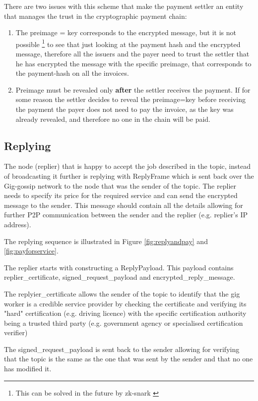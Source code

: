 \documentclass{article}
\begin{document}
There are two issues with this scheme that make the payment settler an entity that manages the trust in the cryptographic payment chain:
\begin{enumerate}
	\item The preimage = key corresponds to the encrypted message, but it is not possible \footnote{This can be solved in the future by zk-snark \cite{zksnark} } to see that just looking at the payment hash and the encrypted message, therefore all the issuers and the payer need to trust the settler that he has encrypted the message with the specific preimage, that corresponds to the payment-hash on all the invoices.
	\item Preimage must be revealed only \textbf{after} the settler receives the payment. If for some reason the settler decides to reveal the preimage=key before receiving the payment the payer does not need to pay the invoice, as the key was already revealed, and therefore no one in the chain will be paid.
\end{enumerate}


\subsection{Replying}
The node (replier) that is happy to accept the job described in the topic, instead of broadcasting it further is replying with ReplyFrame which is sent back over the Gig-gossip network to the node that was the sender of the topic. The replier needs to specify its price for the required service and can send the encrypted message to the sender. This message should contain all the details allowing for further P2P communication between the sender and the replier (e.g. replier's IP address).

The replying sequence is illustrated in Figure \ref{fig:replyandpay} and \ref{fig:payforservice}. 

The replier starts with constructing a ReplyPayload. This payload contains replier\_certificate, signed\_request\_payload and encrypted\_reply\_message.

The replyier\_certificate allows the sender of the topic to identify that the gig worker is a credible service provider by checking the certificate and verifying its "hard" certification (e.g. driving licence) with the specific certification authority being a trusted third party (e.g. government agency or specialised certification verifier)

The signed\_request\_payload is sent back to the sender allowing for verifying that the topic is the same as the one that was sent by the sender and that no one has modified it. 
\end{document}
